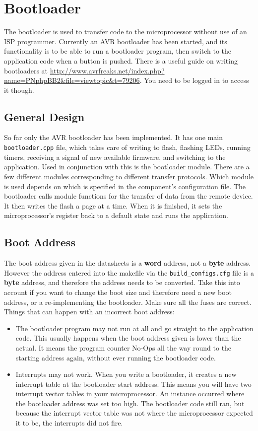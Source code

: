 \documentclass[a4paper, oneside, 11pt, titlepage, onecolumn, openright]{report}
\begin{document}
{\chapter{Bootloader}
			\label{C:Bootloader}
			The bootloader is used to transfer code to the microprocessor without use of an ISP programmer. Currently an AVR bootloader has been started, and its functionality is to be able to run a bootloader program, then switch to the application code when a button is pushed.
			There is a useful guide on writing bootloaders at \url{http://www.avrfreaks.net/index.php?name=PNphpBB2&file=viewtopic&t=79206}. You need to be logged in to access it though.			 
\section{General Design}
			\label{s:BootloaderGeneralDesign}
			So far only the AVR bootloader has been implemented. It has one main \texttt{bootloader.cpp} file, which takes care of writing to flash, flashing LEDs, running timers, receiving a signal of new available firmware, and switching to the application. Used in conjunction with this is the bootloader module. There are a few different modules corresponding to different transfer protocols. Which module is used depends on which is specified in the component's configuration file. 
			The bootloader calls module functions for the transfer of data from the remote device. It then writes the flash a page at a time. When it is finished, it sets the microprocessor's register back to a default state and runs the application.
			
\section{Boot Address}
			\label{s:BootloaderBootAddress}
The boot address given in the datasheets is a \textbf{word} address, not a \textbf{byte} address. However the address entered into the makefile via the \texttt{build\_configs.cfg} file is a \textbf{byte} address, and therefore the address needs to be converted. Take this into account if you want to change the boot size and therefore need a new boot address, or a re-implementing the bootloader. Make sure all the fuses are correct. Things that can happen with an incorrect boot address:

\begin{itemize}
\item The bootloader program may not run at all and go straight to the application code. This usually happens when the boot address given is lower than the actual. It means the program counter No-Ops all the way round to the starting address again, without ever running the bootloader code.
\item Interrupts may not work. When you write a bootloader, it creates a new interrupt table at the bootloader start address. This means you will have two interrupt vector tables in your microprocessor. An instance occurred where the bootloader address was set too high. The bootloader code still ran, but because the interrupt vector table was not where the microprocessor expected it to be, the interrupts did not fire.
\end{itemize}

}
\end{document}
